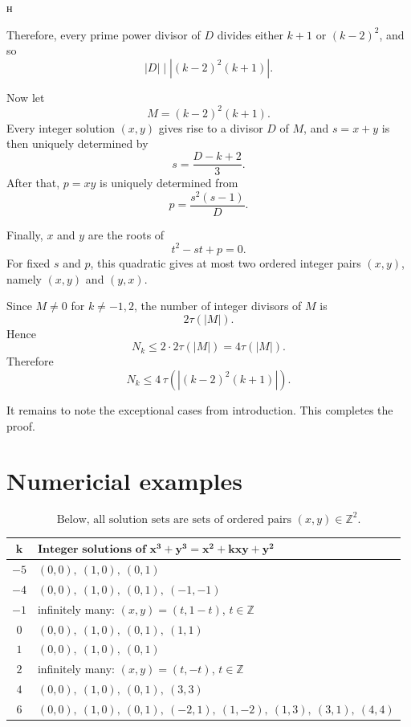 н\documentclass[a4paper,14pt]{extarticle}  %
\begin{document}
Therefore, every prime power divisor of \(D\) divides either \(k+1\) or \((k-2)^2\), and so
\[
|D|\mid |(k-2)^2(k+1)|.
\]

Now let
\[
M=(k-2)^2(k+1).
\]
Every integer solution \((x,y)\) gives rise to a divisor \(D\) of \(M\), and \(s=x+y\) is then uniquely determined by
\[
s=\frac{D-k+2}{3}.
\]
After that, \(p=xy\) is uniquely determined from
\[
p=\frac{s^2(s-1)}{D}.
\]

Finally, \(x\) and \(y\) are the roots of
\[
t^2-st+p=0.
\]
For fixed \(s\) and \(p\), this quadratic gives at most two ordered integer pairs \((x,y)\), namely \((x,y)\) and \((y,x)\).

Since \(M\neq 0\) for \(k\neq -1,2\), the number of integer divisors of \(M\) is
\[
2\tau(|M|).
\]
Hence
\[
N_k\le 2\cdot 2\tau(|M|)=4\tau(|M|).
\]
Therefore
\[
N_k\le 4\,\tau\!\left(\left|(k-2)^2(k+1)\right|\right).
\]

\bigskip

It remains to note the exceptional cases from introduction.
This completes the proof.
\section{Numericial examples}
\[
\text{Below, all solution sets are sets of ordered pairs }(x,y)\in\mathbb Z^2.
\]

\begin{center}
\renewcommand{\arraystretch}{1.25}
\begin{tabular}{c l}
\toprule
\(\boldsymbol{k}\) & \(\boldsymbol{\text{Integer solutions of }x^3+y^3=x^2+kxy+y^2}\) \\
\midrule
\(-5\) & \((0,0),\ (1,0),\ (0,1)\) \\

\(-4\) & \((0,0),\ (1,0),\ (0,1),\ (-1,-1)\) \\

\(-1\) & infinitely many: \((x,y)=(t,1-t)\), \(t\in\mathbb Z\) \\

\(0\) & \((0,0),\ (1,0),\ (0,1),\ (1,1)\) \\

\(1\) & \((0,0),\ (1,0),\ (0,1)\) \\

\(2\) & infinitely many: \((x,y)=(t,-t)\), \(t\in\mathbb Z\) \\

\(4\) & \((0,0),\ (1,0),\ (0,1),\ (3,3)\) \\

\(6\) & \((0,0),\ (1,0),\ (0,1),\ (-2,1),\ (1,-2),\ (1,3),\ (3,1),\ (4,4)\) \\
\bottomrule
\end{tabular}
\end{center}
\end{document}
